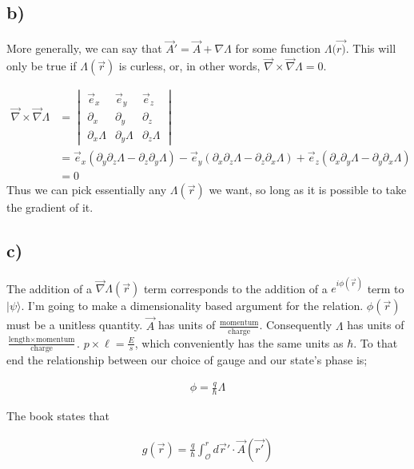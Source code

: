 \documentclass{article}
\newcommand{\p}[1]{\left(#1\right)}
\newcommand{\bra}[1]{|#1\rangle}
\begin{document}
\subsection*{b)}
More generally, we can say that $\vec{A}'=\vec{A}+\nabla\Lambda$ for some function $\Lambda(\vec{r)}$. This will only be true if $\Lambda(\vec{r})$ is curless, or, in other words, $\vec{\nabla}\times\vec{\nabla}\Lambda=0$.

\begin{align*}
    \vec{\nabla}\times\vec{\nabla}\Lambda&=\begin{vmatrix}
        \vec{e}_x &\vec{e}_y &\vec{e}_z \\
        \partial_x &\partial_y &\partial_z \\
        \partial_x\Lambda & \partial_y\Lambda &\partial_z\Lambda
    \end{vmatrix}\\[1em]
    &=\vec{e}_x\p{\partial_y\partial_z\Lambda-\partial_z\partial_y\Lambda}-\vec{e}_y\p{\partial_x\partial_z\Lambda-\partial_z\partial_x\Lambda}+\vec{e}_z\p{\partial_x\partial_y\Lambda-\partial_y\partial_x\Lambda}\\[1em]
    &=0
\end{align*}
Thus we can pick essentially any $\Lambda(\vec{r})$ we want, so long as it is possible to take the gradient of it. 

\subsection*{c)}
The addition of a $\vec{\nabla}\Lambda(\vec{r})$ term corresponds to the addition of a $e^{i\phi(\vec{r})}$ term to $\bra{\psi}$. I'm going to make a dimensionality based argument for the relation. $\phi(\vec{r})$ must be a unitless quantity. $\vec{A}$ has units of $\frac{\text{momentum}}{\text{charge}}$. Consequently $\Lambda$ has units of $\frac{\text{length}\times\text{momentum}}{\text{charge}}$. $p\times\ell=\frac{E}{s}$, which conveniently has the same units as $\hbar$. To that end the relationship between our choice of gauge and our state's phase is;

\begin{align*}
    \phi=\frac{q}{\hbar}\Lambda
\end{align*}

The book states that 

\begin{align*}
    g(\vec{r})=\frac{q}{\hbar}\int_{\mathcal{O}}^rd\vec{r}'\cdot{}\vec{A}(\vec{r'})
\end{align*}
\end{document}
